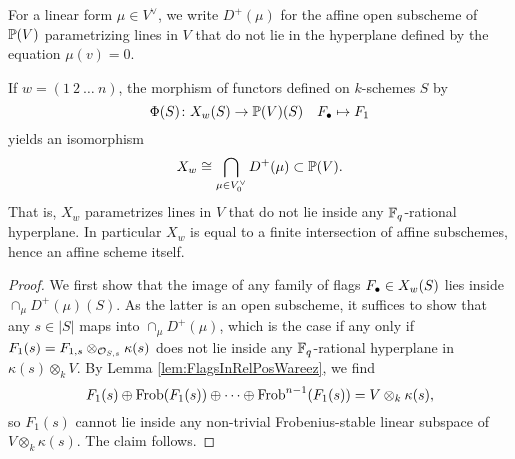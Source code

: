 \documentclass[../main.tex]{subfiles}
\begin{document}
For a linear form $\mu \in V^\vee$, we write 
$D^+(\mu)$ for the affine open subscheme of $\mathbb{P}(V)$ parametrizing
lines in $V$ that do not lie in the hyperplane defined by the equation $\mu(v) = 0$.

\begin{prop}\label{prop:XwExplicitely}
  If $w = (1 \ 2 \ \dots \ n)$, the morphism of functors defined on 
  $k$-schemes $S$ by
  \begin{equation*}
    \Phi(S)\colon  X_w(S) \to \mathbb{P}(V)(S) \quad F_\bullet \mapsto F_1
  \end{equation*}
  yields an isomorphism 
  $$X_w \cong \bigcap_{\mu \in V_0^\vee} D^+(\mu) \subset \mathbb{P}(V).$$
  That is, $X_w$ parametrizes lines in $V$ that do not lie inside any
  $\mathbb{F}_q$-rational hyperplane. In particular $X_w$ is equal to a finite
  intersection of affine subschemes, hence an affine scheme itself.
  \begin{proof} 
  We first show that the image of any family of flags $F_\bullet \in X_w(S)$ lies inside
  $\cap_{\mu} D^+(\mu)(S)$. As the latter is an open subscheme, it suffices to
  show that any $s \in |S|$ maps into
  $\cap_{\mu} D^+(\mu)$, which is the case if any only if $F_1(s) = F_{1,s}
  \otimes_{\mathcal{O}_{S,s}} \kappa(s)$  does not lie inside
  any $\mathbb{F}_q$-rational hyperplane in $\kappa(s) \otimes_k V$. By Lemma
  \ref{lem:FlagsInRelPosWareez}, we find
  $$F_1(s) \oplus \mathrm{Frob}(F_1(s)) \oplus \dots \oplus \mathrm{Frob}^{n-1}(F_1(s)) = V
  \otimes_k \kappa(s),$$
  so $F_1(s)$ cannot lie inside any non-trivial Frobenius-stable linear subspace
  of $V \otimes_k \kappa(s)$. The claim follows. 


\end{proof}
\end{prop}
\end{document}
